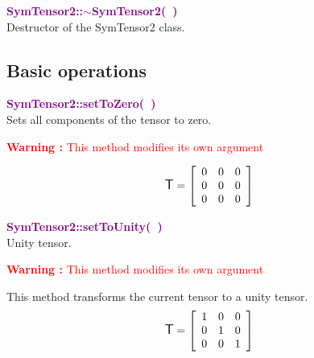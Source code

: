 
\textcolor{purple}{\textbf{SymTensor2::$\sim$SymTensor2(~)}}\label{SymTensor2::~SymTensor2()}\\
Destructor of the SymTensor2 class.


\subsection{Basic operations}

\textcolor{purple}{\textbf{SymTensor2::setToZero(~)}}\label{SymTensor2::setToZero()}\\
Sets all components of the tensor to zero.

\hspace*{10mm}\textcolor{red}{\textbf{Warning :} This method modifies its own argument}

\begin{equation*}
\mbox{\large\ensuremath{\mathsf{T}}}=\left[\begin{array}{ccc}
0&0&0\\
0&0&0\\
0&0&0
\end{array}\right]
\end{equation*}

\textcolor{purple}{\textbf{SymTensor2::setToUnity(~)}}\label{SymTensor2::setToUnity()}\\
Unity tensor.

\hspace*{10mm}\textcolor{red}{\textbf{Warning :} This method modifies its own argument}

This method transforms the current tensor to a unity tensor.
\begin{equation*}
\mbox{\large\ensuremath{\mathsf{T}}}=\left[\begin{array}{ccc}
1&0&0\\
0&1&0\\
0&0&1
\end{array}\right]
\end{equation*}

